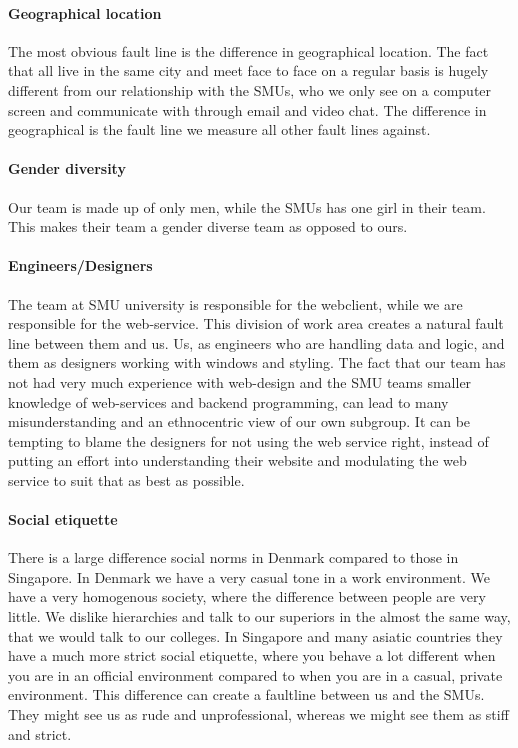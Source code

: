 \documentclass[a4paper,11pt,report]{article}
\begin{document}
\paragraph{Geographical location}
The most obvious fault line is the difference in geographical location. The fact that all live in the same city and meet face to face on a regular basis is hugely different from our relationship with the SMUs, who we only see on a computer screen and communicate with through email and video chat. The difference in geographical is the fault line we measure all other fault lines against.

\paragraph{Gender diversity}
Our team is made up of only men, while the SMUs has one girl in their team. This makes their team a gender diverse team as opposed to ours.

\paragraph{Engineers/Designers}
The team at SMU university is responsible for the webclient, while we are responsible for the web-service. This division of work area creates a natural fault line between them and us. Us, as engineers who are handling data and logic, and them as designers working with windows and styling. The fact that our team has not had very much experience with web-design and the SMU teams smaller knowledge of web-services and backend programming, can lead to many misunderstanding and an ethnocentric view of our own subgroup. It can be tempting to blame the designers for not using the web service right, instead of putting an effort into understanding their website and modulating the web service to suit that as best as possible.

\paragraph{Social etiquette}
There is a large difference social norms in Denmark compared to those in Singapore. In Denmark we have a very casual tone in a work environment. We have a very homogenous society, where the difference between people are very little. We dislike hierarchies and talk to our superiors in the almost the same way, that we would talk to our colleges. In Singapore and many asiatic countries they have a much more strict social etiquette, where you behave a lot different when you are in an official environment compared to when you are in a casual, private environment. This difference can create a faultline between us and the SMUs. They might see us as rude and unprofessional, whereas we might see them as stiff and strict. 
\end{document}
